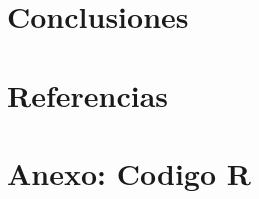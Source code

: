 \documentclass[11pt, a4paper]{article}
\begin{document}
\section{Conclusiones}

\section*{Referencias}

\section*{Anexo: Codigo R}
\end{document}
